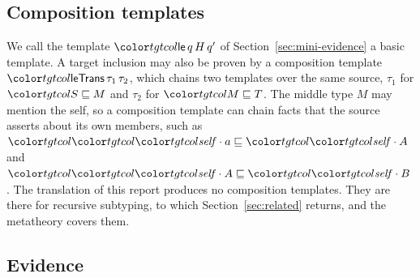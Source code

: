 \subsection{Composition templates}

We call the template $\ev{le}\,q\,H\,q'$ of Section~\ref{sec:mini-evidence} a basic template. A target inclusion may also be proven by a composition template $\ev{leTrans}\,\tau_1\,\tau_2$, which chains two templates over the same source, $\tau_1$ for $\ple{S}{M}$ and $\tau_2$ for $\ple{M}{T}$. The middle type $M$ may mention the self, so a composition template can chain facts that the source asserts about its own members, such as $\ple{\sel{\self}{a}}{\sel{\self}{A}}$ and $\ple{\sel{\self}{A}}{\sel{\self}{B}}$. The translation of this report produces no composition templates. They are there for recursive subtyping, to which Section~\ref{sec:related} returns, and the metatheory covers them.

\subsection{Evidence}

